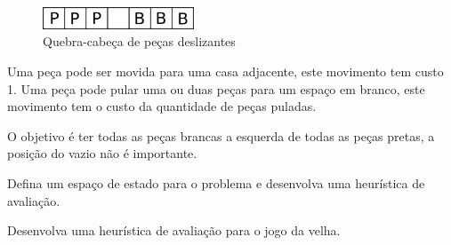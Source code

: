 \documentclass[12pt]{exam}
\begin{document}
\begin{questions}
\begin{figure}[h]
    \centering
    \includegraphics[width=0.40\textwidth]{bp}
    \caption{Quebra-cabeça de peças deslizantes}
    \label{fig:bp}
\end{figure}

Uma peça pode ser movida para uma casa adjacente, este movimento tem custo 1. Uma peça pode pular uma ou duas peças para um espaço em branco, este movimento tem o custo da quantidade de peças puladas.

O objetivo é ter todas as peças brancas a esquerda de todas as peças pretas, a posição do vazio não é importante.

Defina um espaço de estado para o problema e desenvolva uma heurística de avaliação.





\item Desenvolva uma heurística de avaliação para o jogo da velha.


\end{questions}
\end{document}
